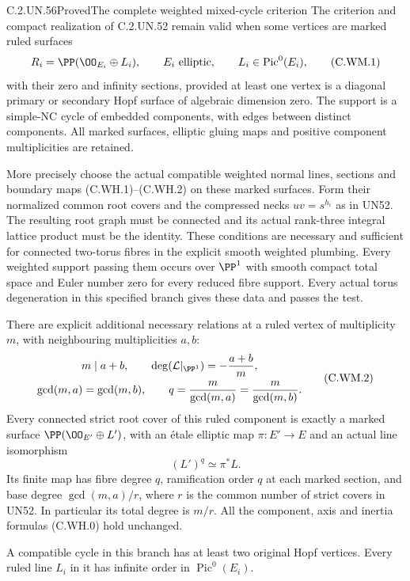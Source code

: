 \begin{statement}{C.2.UN.56}{Proved}{The complete weighted mixed-cycle criterion}
The criterion and compact realization of C.2.UN.52
remain valid when some vertices are marked ruled surfaces
\[
        R_i=\PP(\OO_{E_i}\oplus L_i),\qquad
        E_i\ \hbox{elliptic},\qquad L_i\in\operatorname{Pic}^0(E_i),
\tag{C.WM.1}
\]
with their zero and infinity sections, provided at least
one vertex is a diagonal primary or secondary Hopf surface
of algebraic dimension zero. The support is a simple-NC
cycle of embedded components, with edges between distinct
components. All marked surfaces, elliptic gluing maps and
positive component multiplicities are retained.

More precisely choose the actual compatible weighted normal
lines, sections and boundary maps (C.WH.1)--(C.WH.2) on
these marked surfaces. Form their normalized common root
covers and the compressed necks $uv=s^{h_i}$ as in UN52.
The resulting root graph must be connected and its actual
rank-three integral lattice product must be the identity.
These conditions are necessary and sufficient for connected
two-torus fibres in the explicit smooth weighted plumbing.
Every weighted support passing them occurs over $\PP^1$
with smooth compact total space and Euler number zero for
every reduced fibre support. Every actual torus degeneration
in this specified branch gives these data and passes the test.

There are explicit additional necessary relations at a ruled
vertex of multiplicity $m$, with neighbouring multiplicities
$a,b$:
\[
 \begin{gathered}
      m\mid a+b,\qquad
      \deg(\mathcal L|_{\PP^1})=-\frac{a+b}{m},\\
      \gcd(m,a)=\gcd(m,b),\qquad
      q=\frac{m}{\gcd(m,a)}
         =\frac{m}{\gcd(m,b)}.
 \end{gathered}
\tag{C.WM.2}
\]
Every connected strict root cover of this ruled component
is exactly a marked surface
$\PP(\OO_{E'}\oplus L')$, with an \'{e}tale elliptic map
$\pi:E'\to E$ and an actual line isomorphism
\[
                   (L')^q\simeq\pi^*L.
\tag{C.WM.3}
\]
Its finite map has fibre degree $q$, ramification order
$q$ at each marked section, and base degree
$\gcd(m,a)/r$, where $r$ is the common number of strict
covers in UN52. In particular its total degree is $m/r$.
All the component, axis and inertia formulas (C.WH.0)
hold unchanged.

A compatible cycle in this branch has at least two
original Hopf vertices. Every ruled line $L_i$ in it
has infinite order in $\operatorname{Pic}^0(E_i)$.
\end{statement}

